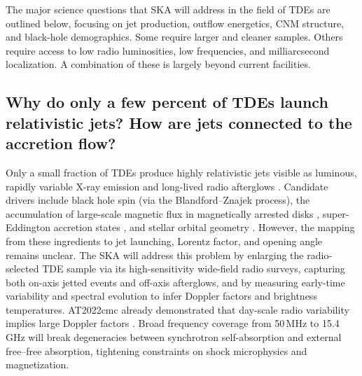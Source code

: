 \documentclass[a4paper,11pt]{article}
\begin{document}
The major science questions that SKA will address in the field of TDEs are outlined below, focusing on jet production, outflow energetics, CNM structure, and black-hole demographics. Some require larger and cleaner samples. Others require access to low radio luminosities, low frequencies, and milliarcsecond localization. A combination of these is largely beyond current facilities.

\subsection{Why do only a few percent of TDEs launch relativistic jets? How are jets connected to the accretion flow?}

Only a small fraction of TDEs produce highly relativistic jets visible as luminous, rapidly variable X-ray emission and long-lived radio afterglows \citep[e.g., Swift~J1644+57, AT2022cmc;][]{Bloom2011,Zauderer2011,Burrows2011,Andreoni2022,Rhodes2023}. Candidate drivers include black hole spin (via the Blandford--Znajek process), the accumulation of large-scale magnetic flux in magnetically arrested disks \citep[MAD;][]{Tchekhovskoy2014}, super-Eddington accretion states \citep{Metzger2016}, and stellar orbital geometry \citep[impact parameter;][]{Guillochon2013}.
However, the mapping from these ingredients to jet launching, Lorentz factor, and opening angle remains unclear. The SKA will address this problem by enlarging the radio-selected TDE sample via its high-sensitivity wide-field radio surveys, capturing both on-axis jetted events and off-axis afterglows, and by measuring early-time variability and spectral evolution to infer Doppler factors and brightness temperatures. AT2022cmc already demonstrated that day-scale radio variability implies large Doppler factors \citep[][]{Yao2024}. Broad frequency coverage from 50\,MHz to 15.4\,GHz will break degeneracies between synchrotron self-absorption and external free--free absorption, tightening constraints on shock microphysics and magnetization.
\end{document}
